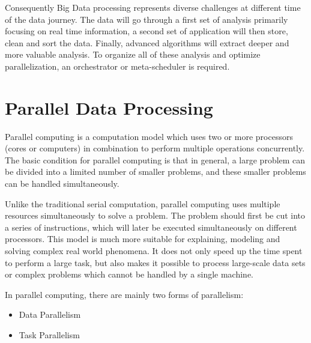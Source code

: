 \documentclass[	DIV=calc,%
							paper=a4,%
							fontsize=11pt,%
							twocolumn]{scrartcl}	 					%
\newcommand{\initial}[1]{%
     \lettrine[lines=3,lhang=0.3,nindent=0em]{
     				\color{DarkBlue}
     				{\textsf{#1}}}{}}
\begin{document}
Consequently Big Data processing represents diverse challenges at different time of the data journey. The data will go through a first set of analysis primarily focusing on real time information, a second set of application will then store, clean and sort the data. Finally, advanced algorithms will extract deeper and more valuable analysis. To organize all of these analysis and optimize parallelization, an orchestrator or meta-scheduler is required.



 

\section*{\color{DarkOrange}Parallel Data Processing}

\initial{P}arallel computing is a computation model which uses two or more processors (cores or computers) in combination to perform multiple operations concurrently. The basic condition for parallel computing is that in general, a large problem can be divided into a limited number of smaller problems, and these smaller problems can be handled simultaneously.
					
Unlike the traditional serial computation, parallel computing uses multiple resources simultaneously to solve a problem. The problem should first be cut into a series of instructions, which will later be executed simultaneously on different processors. This model is much more suitable for explaining, modeling and solving complex real world phenomena. It does not only speed up the time spent to perform a large task, but also makes it possible to process large-scale data sets or complex problems which cannot be handled by a single machine.
					
In parallel computing, there are mainly two forms of parallelism: 
\begin{itemize}
\item Data Parallelism

\item Task Parallelism

\end{itemize}
					
\end{document}
